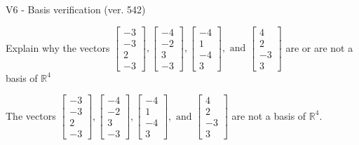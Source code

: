 \begin{exercise}
  \begin{exerciseTitle}V6 - Basis verification (ver. 542)\end{exerciseTitle}
  \begin{exerciseStatement}
    Explain why the vectors \(\left[\begin{array}{r}
-3 \\
-3 \\
2 \\
-3
\end{array}\right] , \left[\begin{array}{r}
-4 \\
-2 \\
3 \\
-3
\end{array}\right] , \left[\begin{array}{r}
-4 \\
1 \\
-4 \\
3
\end{array}\right] , \text{ and } \left[\begin{array}{r}
4 \\
2 \\
-3 \\
3
\end{array}\right]\) are or are not a basis of \(\mathbb{R}^4\)	


  \end{exerciseStatement}
  \begin{exerciseAnswer}
   The vectors \(\left[\begin{array}{r}
-3 \\
-3 \\
2 \\
-3
\end{array}\right] , \left[\begin{array}{r}
-4 \\
-2 \\
3 \\
-3
\end{array}\right] , \left[\begin{array}{r}
-4 \\
1 \\
-4 \\
3
\end{array}\right] , \text{ and } \left[\begin{array}{r}
4 \\
2 \\
-3 \\
3
\end{array}\right]\) 
  	 are not  a basis of \(\mathbb{R}^4\).
  


  \end{exerciseAnswer}
\end{exercise}